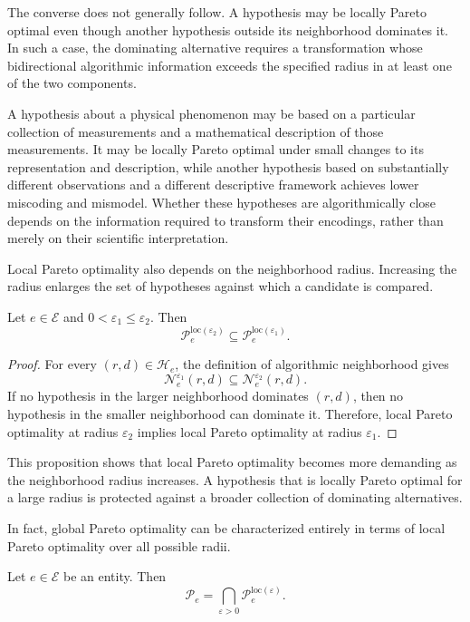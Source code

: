The converse does not generally follow. A hypothesis may be locally Pareto optimal even though another hypothesis outside its neighborhood dominates it. In such a case, the dominating alternative requires a transformation whose bidirectional algorithmic information exceeds the specified radius in at least one of the two components.

\begin{example}
A hypothesis about a physical phenomenon may be based on a particular collection of measurements and a mathematical description of those measurements. It may be locally Pareto optimal under small changes to its representation and description, while another hypothesis based on substantially different observations and a different descriptive framework achieves lower miscoding and mismodel. Whether these hypotheses are algorithmically close depends on the information required to transform their encodings, rather than merely on their scientific interpretation.
\end{example}

Local Pareto optimality also depends on the neighborhood radius. Increasing the radius enlarges the set of hypotheses against which a candidate is compared.

\begin{proposition}
Let $e\in\mathcal E$ and $0<\varepsilon_1\leq\varepsilon_2$. Then
\[
\mathcal P^{\mathrm{loc}(\varepsilon_2)}_e \subseteq \mathcal P^{\mathrm{loc}(\varepsilon_1)}_e.
\]
\end{proposition}
\begin{proof}
For every $(r,d)\in\mathcal H_e$, the definition of algorithmic neighborhood gives
\[
\mathcal N^{\varepsilon_1}_e(r,d) \subseteq \mathcal N^{\varepsilon_2}_e(r,d).
\]
If no hypothesis in the larger neighborhood dominates $(r,d)$, then no hypothesis in the smaller neighborhood can dominate it. Therefore, local Pareto optimality at radius $\varepsilon_2$ implies local Pareto optimality at radius $\varepsilon_1$.
\end{proof}

This proposition shows that local Pareto optimality becomes more demanding as the neighborhood radius increases. A hypothesis that is locally Pareto optimal for a large radius is protected against a broader collection of dominating alternatives.

In fact, global Pareto optimality can be characterized entirely in terms of local Pareto optimality over all possible radii.

\begin{proposition}
Let $e\in\mathcal E$ be an entity. Then
\[
\mathcal P_e = \bigcap_{\varepsilon>0} \mathcal P^{\mathrm{loc}(\varepsilon)}_e.
\]
\end{proposition}

